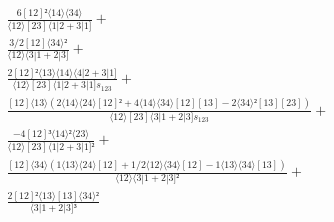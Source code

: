 \documentclass[varwidth, border=5pt]{standalone}
\begin{document}
\begin{my}
$\begin{gathered}
\scriptscriptstyle\frac{6[12]²⟨14⟩⟨34⟩}{⟨12⟩[23]⟨1|2+3|1]} +\\
\scriptscriptstyle\frac{3/2[12]⟨34⟩²}{⟨12⟩⟨3|1+2|3]} +\\
\scriptscriptstyle\frac{2[12]²⟨13⟩⟨14⟩⟨4|2+3|1]}{⟨12⟩[23]⟨1|2+3|1]s_{123}} +\\
\scriptscriptstyle\frac{[12]⟨13⟩(2⟨14⟩⟨24⟩[12]²+4⟨14⟩⟨34⟩[12][13]-2⟨34⟩²[13][23])}{⟨12⟩[23]⟨3|1+2|3]s_{123}} +\\
\scriptscriptstyle\frac{-4[12]³⟨14⟩²⟨23⟩}{⟨12⟩[23]⟨1|2+3|1]²} +\\
\scriptscriptstyle\frac{[12]⟨34⟩(1⟨13⟩⟨24⟩[12]+1/2⟨12⟩⟨34⟩[12]-1⟨13⟩⟨34⟩[13])}{⟨12⟩⟨3|1+2|3]²} +\\
\scriptscriptstyle\frac{2[12]²⟨13⟩[13]⟨34⟩²}{⟨3|1+2|3]³} \phantom{+}
\end{gathered}$
\end{my}
\end{document}
